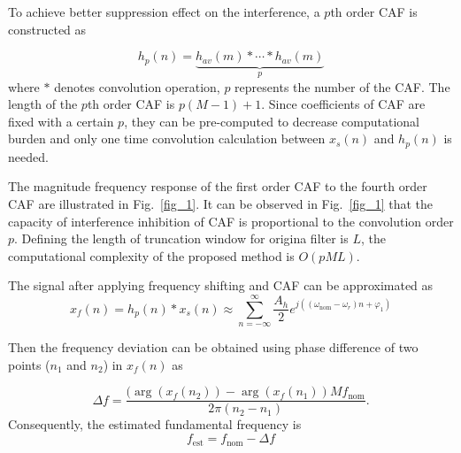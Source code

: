 \documentclass[journal,twoside]{IEEEtran}
\begin{document}
To achieve better suppression effect on the interference, a $p$th order CAF is constructed as

\begin{equation}
h_p(n)=\underbrace{h_{av}(m)*\cdots*h_{av}(m)}_{p}\label{eqn_9}
\end{equation}
where $*$ denotes convolution operation, $p$ represents the number of the CAF. The  length of the $p$th order CAF is $p(M-1)+1$. Since coefficients of CAF are fixed with a certain $p$, they can be pre-computed to decrease computational burden and only one time convolution calculation between $x_s(n)$ and $h_p(n)$ is needed. 

The magnitude frequency response of the first order CAF to the fourth order CAF are illustrated in Fig.~\ref{fig_1}. It can be observed in Fig.~\ref{fig_1} that the capacity of interference inhibition  of CAF is proportional to the convolution order $p$. Defining the length of truncation window  for origina  filter is $L$, the computational complexity of the proposed method is $O(pML)$.

The signal after applying frequency shifting and CAF  can be approximated  as
\begin{equation}
x_f(n)=h_p(n)*x_s(n)\approx\sum_{n=-\infty}^{\infty}\dfrac{A_h}{2}e^{j\left((\omega_\mathrm{nom}-\omega_r)n+\varphi_1\right)}\label{eqn_10}
\end{equation}


Then the frequency deviation can be obtained using phase difference of two points ($n_1$ and $n_2$) in $x_f(n)$ as

\begin{equation}
\Delta f=\dfrac{(\arg(x_f(n_2))-\arg(x_f(n_1))Mf_\mathrm{nom}}{2\pi(n_2-n_1)}.\label{eqn_12}
\end{equation}
Consequently, the estimated fundamental frequency is
\begin{equation}
f_\mathrm{est}=f_\mathrm{nom}-\Delta f\label{eqn_13}
\end{equation}
\end{document}
